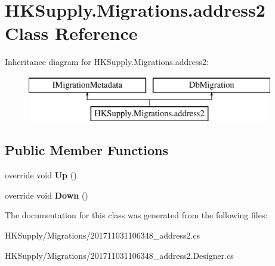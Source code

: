 \hypertarget{class_h_k_supply_1_1_migrations_1_1address2}{}\section{H\+K\+Supply.\+Migrations.\+address2 Class Reference}
\label{class_h_k_supply_1_1_migrations_1_1address2}
Inheritance diagram for H\+K\+Supply.\+Migrations.\+address2\+:\begin{figure}[H]
\begin{center}
\leavevmode
\includegraphics[height=2.000000cm]{class_h_k_supply_1_1_migrations_1_1address2}
\end{center}
\end{figure}
\subsection*{Public Member Functions}
\begin{DoxyCompactItemize}
\item 
\mbox{\label{class_h_k_supply_1_1_migrations_1_1address2_aa86f477f9678511caa190ab95307bc2b}} 
override void {\bfseries Up} ()
\item 
\mbox{\label{class_h_k_supply_1_1_migrations_1_1address2_ae37508ed17ac3b3d5d23307401b12c7c}} 
override void {\bfseries Down} ()
\end{DoxyCompactItemize}


The documentation for this class was generated from the following files\+:\begin{DoxyCompactItemize}
\item 
H\+K\+Supply/\+Migrations/201711031106348\+\_\+address2.\+cs\item 
H\+K\+Supply/\+Migrations/201711031106348\+\_\+address2.\+Designer.\+cs\end{DoxyCompactItemize}
